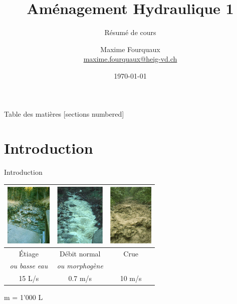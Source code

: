 \documentclass{beamer}
\title{Aménagement Hydraulique 1}
\subtitle{Résumé de cours}
\author{Maxime Fourquaux\\{\small \href{mailto:maxime.fourquaux@heig-vd.ch}{maxime.fourquaux@heig-vd.ch}}}
\institute[HEIG]%
{
    HEIG-VD | EC+G \\
    Orientation GGT \\
}
\date{\today}
\begin{document}
\frame{\titlepage}

\begin{frame}{Table des matières}
  [sections numbered]
  \tableofcontents%
\end{frame}

\section{Introduction}
\begin{frame}{Introduction}
    \begin{table}
        \centering
        \begin{tabular}{c|c|c}
            \includegraphics[height=3cm]{etiage.png} & \includegraphics[height=3cm]{debitNormal.png} & \includegraphics[height=3cm]{crue.png} \\
            \hline
            Étiage                & Débit normal           & Crue \\
            \textit{ou basse eau} & \textit{ou morphogène} &      \\       
            15 L/s                & 0.7 m\up{3}/s          & 10 m\up{3}/s \\
        \end{tabular}
    \end{table}
     m = 1'000 L
\end{frame}
\end{document}
